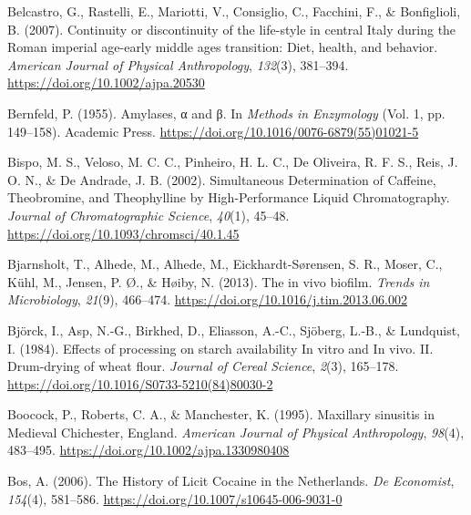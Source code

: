\documentclass[
  letterpaper,
]{book}
\newlength{\cslhangindent}
\newlength{\cslentryspacingunit} %
\newenvironment{CSLReferences}[2] %
 {%
  \setlength{\parindent}{0pt}
  \ifodd #1
  \let\oldpar\par
  \def\par{\hangindent=\cslhangindent\oldpar}
  \fi
  \setlength{\parskip}{#2\cslentryspacingunit}
 }%
 {}
\begin{document}
\begin{CSLReferences}{1}{0}
\leavevmode{}%
Belcastro, G., Rastelli, E., Mariotti, V., Consiglio, C., Facchini, F.,
\& Bonfiglioli, B. (2007). Continuity or discontinuity of the life-style
in central {Italy} during the {Roman} imperial age-early middle ages
transition: {Diet}, health, and behavior. \emph{American Journal of
Physical Anthropology}, \emph{132}(3), 381--394.
\url{https://doi.org/10.1002/ajpa.20530}

\leavevmode{}%
Bernfeld, P. (1955). Amylases, α and β. In \emph{Methods in
{Enzymology}} (Vol. 1, pp. 149--158). {Academic Press}.
\url{https://doi.org/10.1016/0076-6879(55)01021-5}

\leavevmode{}%
Bispo, M. S., Veloso, M. C. C., Pinheiro, H. L. C., De Oliveira, R. F.
S., Reis, J. O. N., \& De Andrade, J. B. (2002). Simultaneous
{Determination} of {Caffeine}, {Theobromine}, and {Theophylline} by
{High-Performance Liquid Chromatography}. \emph{Journal of
Chromatographic Science}, \emph{40}(1), 45--48.
\url{https://doi.org/10.1093/chromsci/40.1.45}

\leavevmode{}%
Bjarnsholt, T., Alhede, M., Alhede, M., Eickhardt-Sørensen, S. R.,
Moser, C., Kühl, M., Jensen, P. Ø., \& Høiby, N. (2013). The in vivo
biofilm. \emph{Trends in Microbiology}, \emph{21}(9), 466--474.
\url{https://doi.org/10.1016/j.tim.2013.06.002}

\leavevmode{}%
Björck, I., Asp, N.-G., Birkhed, D., Eliasson, A.-C., Sjöberg, L.-B., \&
Lundquist, I. (1984). Effects of processing on starch availability {In}
vitro and {In} vivo. {II}. {Drum-drying} of wheat flour. \emph{Journal
of Cereal Science}, \emph{2}(3), 165--178.
\url{https://doi.org/10.1016/S0733-5210(84)80030-2}

\leavevmode{}%
Boocock, P., Roberts, C. A., \& Manchester, K. (1995). Maxillary
sinusitis in {Medieval Chichester}, {England}. \emph{American Journal of
Physical Anthropology}, \emph{98}(4), 483--495.
\url{https://doi.org/10.1002/ajpa.1330980408}

\leavevmode{}%
Bos, A. (2006). The {History} of {Licit Cocaine} in the {Netherlands}.
\emph{De Economist}, \emph{154}(4), 581--586.
\url{https://doi.org/10.1007/s10645-006-9031-0}


\end{CSLReferences}
\end{document}
